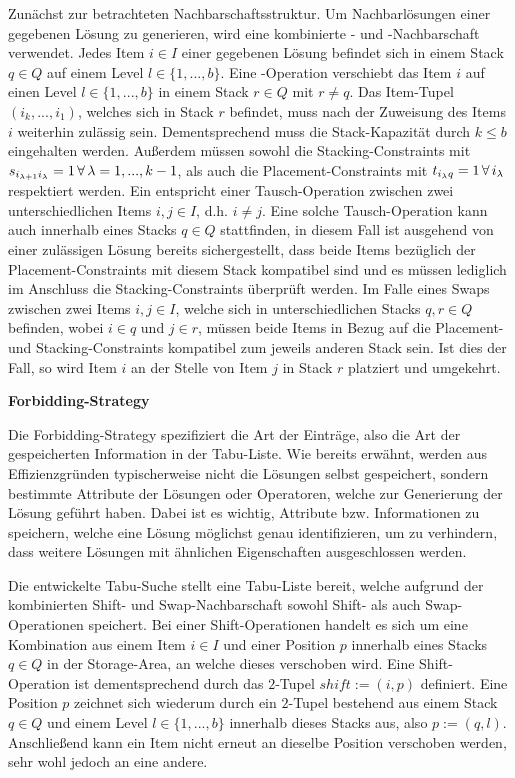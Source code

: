 Zunächst zur betrachteten Nachbarschaftsstruktur. Um Nachbarlösungen einer gegebenen Lösung zu generieren,
wird eine kombinierte - und -Nachbarschaft verwendet.
Jedes Item $i \in I$ einer gegebenen Lösung befindet sich in einem Stack $q \in Q$ auf einem Level $l \in \{1, ..., b\}$.
Eine -Operation verschiebt das Item $i$ auf einen Level $l \in \{1, ..., b\}$ in einem
Stack $r \in Q$ mit $r \neq q$. Das Item-Tupel $(i_k, ..., i_1)$, welches sich in Stack $r$ befindet, muss nach der Zuweisung des Items $i$ weiterhin zulässig sein. Dementsprechend muss die Stack-Kapazität durch $k \leq b$ eingehalten werden.
Außerdem müssen sowohl die Stacking-Constraints mit $s_{i_{\lambda + 1}i_\lambda} = 1 \thinspace \forall \thinspace
\lambda = 1, ..., k - 1$, als auch die Placement-Constraints mit $t_{i_\lambda q} = 1 \thinspace \forall
\thinspace i_\lambda$ respektiert werden.
Ein  entspricht einer Tausch-Operation zwischen zwei unterschiedlichen Items $i, j \in I$,
d.h. $i \neq j$. Eine solche Tausch-Operation kann auch innerhalb eines Stacks $q \in Q$ stattfinden,
in diesem Fall ist ausgehend von einer zulässigen Lösung bereits sichergestellt, dass beide Items bezüglich der Placement-Constraints mit diesem Stack kompatibel sind und es müssen lediglich im Anschluss die Stacking-Constraints überprüft werden. Im Falle eines Swaps zwischen zwei Items $i, j \in I$, welche sich in unterschiedlichen Stacks $q, r \in Q$ befinden, wobei $i \in q$ und $j \in r$, müssen beide Items in Bezug auf die Placement- und Stacking-Constraints kompatibel zum jeweils anderen Stack sein. Ist dies der Fall, so wird Item $i$ an der Stelle von Item $j$ in Stack $r$ platziert und umgekehrt.

\textbf{Forbidding-Strategy}

Die Forbidding-Strategy spezifiziert die Art der Einträge, also die Art der gespeicherten Information in der
Tabu-Liste. Wie bereits erwähnt, werden aus Effizienzgründen typischerweise nicht die Lösungen selbst gespeichert,
sondern bestimmte Attribute der Lösungen oder Operatoren, welche zur Generierung der Lösung geführt haben.
Dabei ist es wichtig, Attribute bzw. Informationen zu speichern, welche eine Lösung möglichst genau identifizieren,
um zu verhindern, dass weitere Lösungen mit ähnlichen Eigenschaften ausgeschlossen werden.

\vfill
\pagebreak

Die entwickelte Tabu-Suche stellt eine Tabu-Liste bereit, welche aufgrund der kombinierten Shift- und Swap-Nachbarschaft
sowohl Shift- als auch Swap-Operationen speichert. Bei einer Shift-Operationen handelt es sich um eine Kombination aus einem Item
$i \in I$ und einer Position $p$ innerhalb eines Stacks $q \in Q$ in der Storage-Area, an welche dieses verschoben wird. Eine Shift-Operation ist dementsprechend durch das $2$-Tupel $shift := (i, p)$ definiert.
Eine Position $p$ zeichnet sich wiederum durch ein $2$-Tupel bestehend aus einem Stack $q \in Q$ und einem Level $l \in \{1, ..., b\}$ innerhalb dieses Stacks aus, also $p := (q, l)$.
Anschließend kann ein Item nicht erneut an dieselbe Position verschoben werden, sehr wohl jedoch an eine andere.

